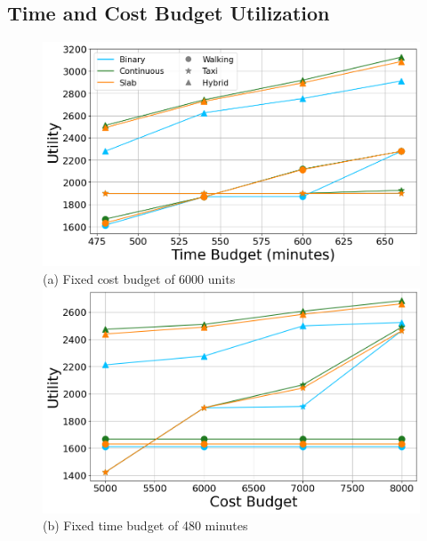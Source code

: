 \subsection{Time and Cost Budget Utilization}
\label{sec:exp cost and time budget utilization}

\begin{figure}[t]
\centering
\includegraphics[width=\figwidth]{plots/multimodality1.png} \\
(a) Fixed cost budget of 6000 units 
\includegraphics[width=\figwidth]{plots/multimodality2.png} \\
(b) Fixed time budget of 480 minutes
\label{fig:multi-modal}
\end{figure}

